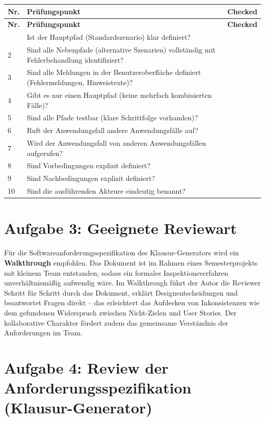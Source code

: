 \documentclass[
	fontsize=12pt,          %
	paper=a4,               %
	numbers=noenddot,       %
	listof=totoc,           %
	listof=entryprefix,     %
	listof=nochaptergap,    %
	bibliography=totoc,     %
	parskip=half,           %
	openany                 %
]{scrbook}
\begin{document}
\begin{longtable}{| p{0.65cm} | p{10.9cm} | p{1.6cm} |}
	\hline
	\textbf{Nr.} & \textbf{Prüfungspunkt} & \textbf{Checked} \\ \hline
	\endfirsthead
	\hline
	\textbf{Nr.} & \textbf{Prüfungspunkt} & \textbf{Checked} \\ \hline
	\endhead
	\hline
	\endfoot
	1  & Ist der Hauptpfad (Standardszenario) klar definiert? & \\ \hline
	2  & Sind alle Nebenpfade (alternative Szenarien) vollständig mit Fehlerbehandlung identifiziert? & \\ \hline
	3  & Sind alle Meldungen in der Benutzeroberfläche definiert (Fehlermeldungen, Hinweistexte)? & \\ \hline
	4  & Gibt es nur einen Hauptpfad (keine mehrfach kombinierten Fälle)? & \\ \hline
	5  & Sind alle Pfade testbar (klare Schrittfolge vorhanden)? & \\ \hline
	6  & Ruft der Anwendungsfall andere Anwendungsfälle auf? & \\ \hline
	7  & Wird der Anwendungsfall von anderen Anwendungsfällen aufgerufen? & \\ \hline
	8  & Sind Vorbedingungen explizit definiert? & \\ \hline
	9  & Sind Nachbedingungen explizit definiert? & \\ \hline
	10 & Sind die ausführenden Akteure eindeutig benannt? & \\ \hline
\end{longtable}


\chapter*{Aufgabe 3: Geeignete Reviewart}

Für die Softwareanforderungsspezifikation des Klausur-Generators wird ein \textbf{Walkthrough} empfohlen.
Das Dokument ist im Rahmen eines Semesterprojekts mit kleinem Team entstanden, sodass ein formales Inspektionsverfahren unverhältnismäßig aufwendig wäre.
Im Walkthrough führt der Autor die Reviewer Schritt für Schritt durch das Dokument, erklärt Designentscheidungen und beantwortet Fragen direkt -- das erleichtert das Aufdecken von Inkonsistenzen wie dem gefundenen Widerspruch zwischen Nicht-Zielen und User Stories.
Der kollaborative Charakter fördert zudem das gemeinsame Verständnis der Anforderungen im Team.


\chapter*{Aufgabe 4: Review der Anforderungsspezifikation (Klausur-Generator)}
\end{document}
